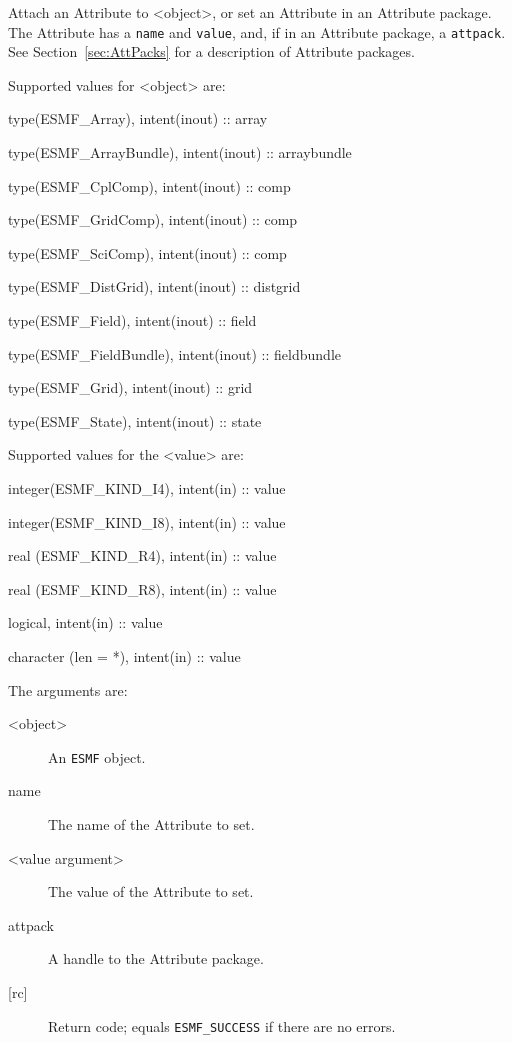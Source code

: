    Attach an Attribute to <object>, or set an Attribute in an
   Attribute package. The Attribute has a {\tt name} and {\tt value},
   and, if in an Attribute package, a {\tt attpack}.
   See Section~\ref{sec:AttPacks} for a description of Attribute packages.
  
   Supported values for <object> are:
   \begin{description}
   \item type(ESMF\_Array), intent(inout) :: array
   \item type(ESMF\_ArrayBundle), intent(inout) :: arraybundle
   \item type(ESMF\_CplComp), intent(inout) :: comp
   \item type(ESMF\_GridComp), intent(inout) :: comp
   \item type(ESMF\_SciComp), intent(inout) :: comp
   \item type(ESMF\_DistGrid), intent(inout) :: distgrid
   \item type(ESMF\_Field), intent(inout) :: field
   \item type(ESMF\_FieldBundle), intent(inout) :: fieldbundle
   \item type(ESMF\_Grid), intent(inout) :: grid
   \item type(ESMF\_State), intent(inout) :: state
   \end{description}
  
   Supported values for the <value> are:
   \begin{description}
   \item integer(ESMF\_KIND\_I4), intent(in) :: value
   \item integer(ESMF\_KIND\_I8), intent(in) :: value
   \item real (ESMF\_KIND\_R4), intent(in) :: value
   \item real (ESMF\_KIND\_R8), intent(in) :: value
   \item logical, intent(in) :: value
   \item character (len = *), intent(in) :: value
   \end{description}
  
   The arguments are:
   \begin{description}
   \item [<object>]
   An {\tt ESMF} object.
   \item [name]
   The name of the Attribute to set.
   \item [<value argument>]
   The value of the Attribute to set.
   \item [attpack]
   A handle to the Attribute package.
   \item [{[rc]}]
   Return code; equals {\tt ESMF\_SUCCESS} if there are no errors.
   \end{description}
  
